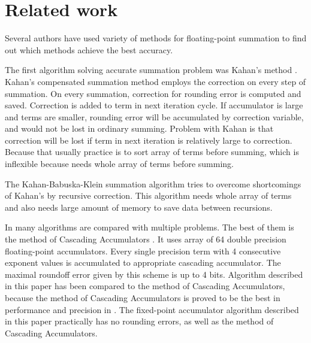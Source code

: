 \documentclass[conference]{IEEEtran}
\begin{document}
\section{Related work}
Several authors have used variety of methods for floating-point 
summation to find out which methods achieve the best accuracy. 
\par
The first algorithm solving accurate summation problem was Kahan's method \cite{Kahan}. 
Kahan's compensated summation method employs the correction 
on every step of summation. 
On every summation, correction for rounding error is computed and saved.
Correction is added to term in next iteration cycle.
If accumulator is large and terms are smaller, rounding error will be accumulated by correction variable, 
and would not be lost in ordinary summing.
Problem with Kahan is that correction will be lost if term in next iteration is relatively large to correction.
Because that usually practice is to sort array of terms before summing, 
which is inflexible because needs whole array of terms before summing.
\par
The Kahan-Babuska-Klein summation algorithm \cite{KahanBabuskaKlein} tries to overcome shortcomings of Kahan's by recursive correction.
This algorithm needs whole array of terms and also needs large amount of memory to save data between recursions.
\par
In \cite{ComparisonOfMethods} many algorithms are compared with multiple problems.
The best of them is the method of Cascading Accumulators \cite{CascadingAccumulators}.
It uses array of 64 double precision floating-point accumulators.
Every single precision term with 4 consecutive exponent values is accumulated to appropriate cascading accumulator.
The maximal roundoff error given by this scheme is up to 4 bits.
Algorithm described in this paper has been compared to the method of Cascading Accumulators,
because the method of Cascading Accumulators is proved 
to be the best in performance and precision in \cite{ComparisonOfMethods}.
The fixed-point accumulator algorithm described in this paper practically has no rounding errors,
as well as the method of Cascading Accumulators.
\end{document}
